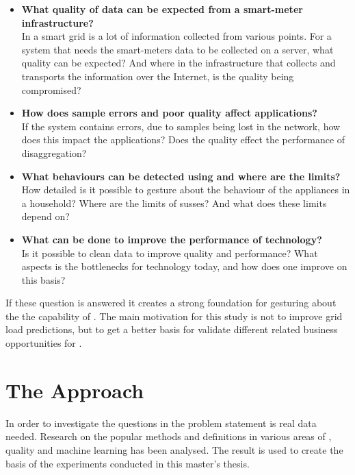 \begin{itemize}
\item	\textbf{What quality of data can be expected from a smart-meter infrastructure?}\\
In a smart grid is a lot of information collected from various points. For a system that needs the smart-meters data to be collected on a server, what quality can be expected? And where in the infrastructure that collects and transports the information over the Internet, is the quality being compromised? \\
	
	
\item	\textbf{How does sample errors and poor quality affect  applications?}\\
If the system contains errors, due to samples being lost in the network, how does this impact the  applications?  Does the quality effect the performance of  disaggregation? \\
	
\item	\textbf{What behaviours can be detected using  and where are the limits?} \\
How detailed is it possible to gesture about the behaviour of the appliances in a household? Where are the limits of susses? And what does these limits depend on?  \\
	
\item	\textbf{What can be done to improve the performance of  technology?}\\
Is it possible to clean data to improve quality and performance? What aspects is the bottlenecks for  technology today, and how does one improve on this basis? \\

\end{itemize}
If these question is answered it creates a strong foundation for gesturing about the the capability of . The main motivation for this study is not to improve grid load predictions, but to get a better basis for validate different  related business opportunities for . \\

\section{The Approach}
In order to investigate the questions in the problem statement is real data needed. Research on the  popular methods and definitions in various areas of , quality and machine learning has been analysed. The result is used to create the basis of the experiments conducted in this master's thesis. 

